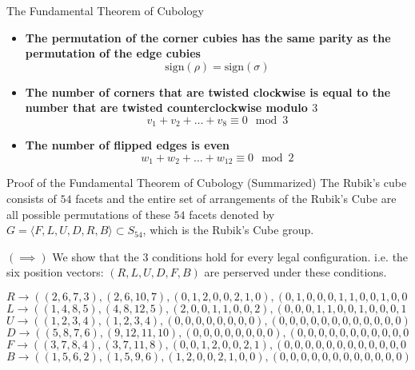 \documentclass[final]{beamer}
\newlength{\colwidth}
\begin{document}
\begin{frame}[t]
\begin{columns}[t]
\begin{column}{\colwidth}
\begin{alertblock}{The Fundamental Theorem of Cubology}
    \begin{itemize}
      \item \textbf{The permutation of the corner cubies has the same parity as the permutation of the edge cubies} 
      $$\text{sign}(\rho) = \text{sign}(\sigma)$$
      \item \textbf{The number of corners that are twisted clockwise is equal to the number that are twisted counterclockwise modulo $3$}
      $$v_{1} + v_{2} +\dots +v_{8} \equiv 0 \mod 3$$
      \item \textbf{The number of flipped edges is even}
      $$w_{1} + w_{2} +\dots +w_{12} \equiv 0 \mod 2$$
    \end{itemize}


  \end{alertblock}

  \begin{block}{Proof of the Fundamental Theorem of Cubology (Summarized)}
    The Rubik's cube consists of $54$ facets and the entire set of arrangements of the Rubik's Cube are all possible permutations of these $54$ facets 
    denoted  by $G = \langle F,L,U,D,R,B\rangle \subset S_{54}$, which is the Rubik's Cube group.



$(\implies)$ 
We show that the $3$ conditions hold for every legal configuration. i.e. the six position vectors: $(R,L,U,D,F,B)$ are perserved under these conditions.

$$R \rightarrow ((2,6,7,3),(2,6,10,7),(0,1,2,0,0,2,1,0),(0,1,0,0,0,1,1,0,0,1,0,0))$$
$$L \rightarrow ((1 ,4,8,5),(4,8,12,5),(2, 0, 0, 1, 1, 0, 0, 2), (0, 0, 0, 1, 1, 0, 0, 1, 0, 0, 0, 1))$$
$$U \rightarrow ((1, 2, 3, 4), (1, 2, 3, 4), (0, 0, 0, 0, 0, 0, 0, 0), (0, 0, 0, 0, 0, 0, 0, 0, 0, 0, 0, 0))$$
$$D \rightarrow ((5, 8, 7, 6), (9, 12, 11, 10), (0, 0, 0, 0, 0, 0, 0, 0), (0, 0, 0, 0, 0, 0, 0, 0, 0, 0, 0, 0))$$
$$F \rightarrow ((3, 7, 8, 4), (3, 7, 11, 8), (0, 0, 1, 2, 0, 0, 2, 1), (0, 0, 0, 0, 0, 0, 0, 0, 0, 0, 0, 0))$$
$$B \rightarrow ((1, 5, 6, 2), (1, 5, 9, 6), (1, 2, 0, 0, 2, 1, 0, 0), (0, 0, 0, 0, 0, 0, 0, 0, 0, 0, 0, 0))$$


\end{block}
\end{column}
\end{columns}
\end{frame}
\end{document}
